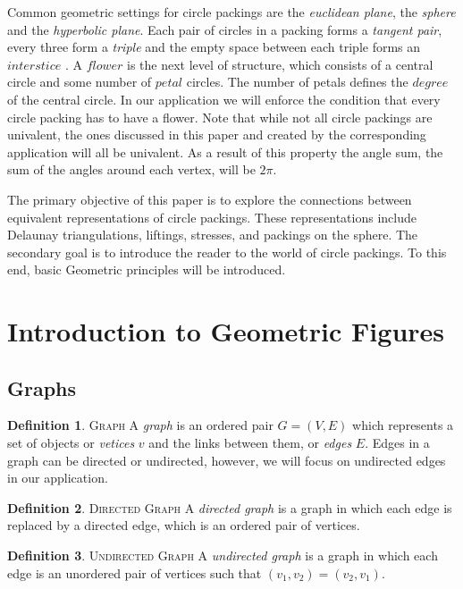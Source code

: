 \documentclass[11pt]{article}
\theoremstyle{definition}
\newtheorem{definition}{Definition}[section]
\begin{document}
Common geometric settings for circle packings are the \emph{euclidean plane}, the \emph{sphere} and the \emph{hyperbolic plane}. Each pair of circles in a packing forms a \emph{tangent pair}, every three form a \emph{triple} and the empty space between each triple forms an $interstice$ \cite{stephenson05introduction}. A $flower$ is the next level of structure, which consists of a central circle and some number of $petal$ circles. The number of petals defines the $degree$ of the central circle. In our application we will enforce the condition that every circle packing has to have a flower. Note that while not all circle packings are univalent, the ones discussed in this paper and created by the corresponding application will all be univalent. As a result of this property the angle sum, the sum of the angles around each vertex, will be $2\pi$.

The primary objective of this paper is to explore the connections between equivalent representations of circle packings. These representations include Delaunay triangulations, liftings, stresses, and packings on the sphere. The secondary goal is to introduce the reader to the world of circle packings. To this end, basic Geometric principles will be introduced.

\section{Introduction to Geometric Figures}
\subsection{Graphs}
	\theoremstyle{definition}
	\begin{definition}{\textsc{Graph}}
		A \emph{graph} is an ordered pair $G=(V,E)$ which represents a set of objects or \emph{vetices} $v$ and the links between them, or \emph{edges} $E$. 
		Edges in a graph can be directed or undirected, however, we will focus on undirected edges in our application. 
	\end{definition}
	
	\theoremstyle{definition}
	\begin{definition}{\textsc{Directed Graph}}
  		A \emph{directed graph} is a graph in which each edge is replaced by a directed edge, which is an ordered pair of vertices.
  	\end{definition}
	
	\theoremstyle{definition}
	\begin{definition}{\textsc{Undirected Graph}}
  		A \emph{undirected graph} is a graph in which each edge is an unordered pair of vertices such that $(v_1, v_2) = (v_2, v_1)$.
  	\end{definition}
	
\end{document}
